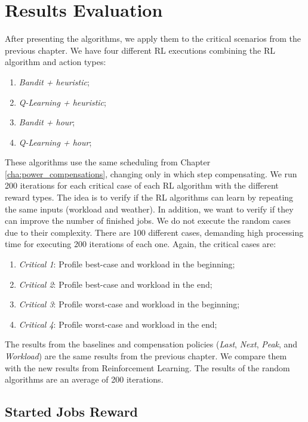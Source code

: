 \section{Results Evaluation}

After presenting the algorithms, we apply them to the critical scenarios from the previous chapter. We have four different RL executions combining the RL algorithm and action types: 

\begin{enumerate}
    \item \emph{Bandit + heuristic};
    \item \emph{Q-Learning + heuristic};
    \item \emph{Bandit + hour};
    \item \emph{Q-Learning + hour};
\end{enumerate}

These algorithms use the same scheduling from Chapter \ref{cha:power_compensations}, changing only in which step compensating. We run 200 iterations for each critical case of each RL algorithm with the different reward types. The idea is to verify if the RL algorithms can learn by repeating the same inputs (workload and weather). In addition, we want to verify if they can improve the number of finished jobs. We do not execute the random cases due to their complexity. There are 100 different cases, demanding high processing time for executing 200 iterations of each one. Again, the critical cases are:
\begin{enumerate}
    \item \emph{Critical 1}: Profile best-case and workload in the beginning;
    \item \emph{Critical 2}: Profile best-case and workload in the end;
    \item \emph{Critical 3}: Profile worst-case and workload in the beginning;
    \item \emph{Critical 4}: Profile worst-case and workload in the end;
\end{enumerate}

The results from the baselines and compensation policies (\emph{Last}, \emph{Next}, \emph{Peak}, and \emph{Workload}) are the same results from the previous chapter. We compare them with the new results from Reinforcement Learning. The results of the random algorithms are an average of 200 iterations.

\subsection{Started Jobs Reward}

